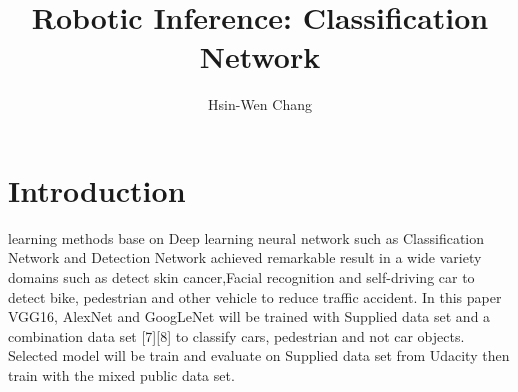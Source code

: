 \documentclass[10pt,journal,compsoc]{IEEEtran}
\begin{document}
\title{Robotic Inference: Classification Network}

\author{Hsin-Wen Chang}

%
{}


\maketitle
\IEEEdisplaynontitleabstractindextext
\IEEEpeerreviewmaketitle
\section{Introduction}
\label{sec:introduction}

 learning methods base on Deep learning neural network such as Classification Network and Detection Network achieved remarkable result in a wide variety domains such as detect skin cancer,Facial recognition and self-driving car to detect bike, pedestrian and other vehicle to reduce traffic accident. In this paper VGG16, AlexNet and GoogLeNet will be trained with Supplied data set and a combination data set [7][8] to classify cars, pedestrian and not car objects. Selected model will be train and evaluate on Supplied data set from Udacity then train with the mixed public data set.
\end{document}
